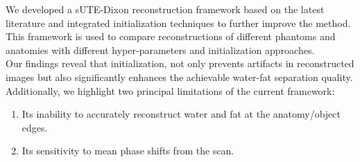 We developed a sUTE-Dixon reconstruction framework based on the latest literature and integrated initialization techniques to further improve the method. This framework is used to compare reconstructions of different phantoms and anatomies with different hyper-parameters and initialization approaches.\\

Our findings reveal that initialization, not only prevents artifacts in reconstructed images but also significantly enhances the achievable water-fat separation quality. Additionally, we highlight two principal limitations of the current framework: 
\begin{enumerate}
\item Its inability to accurately reconstruct water and fat at the anatomy/object edges.
\item Its sensitivity to mean phase shifts from the scan.
\end{enumerate}

\endgroup

\vfill
